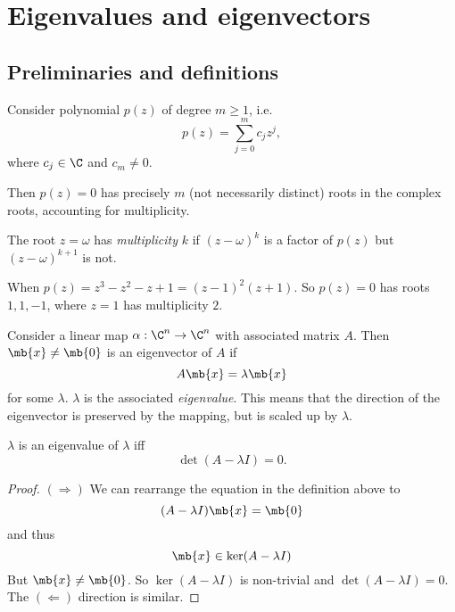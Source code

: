 \documentclass[a4paper]{article}
\begin{document}
\section{Eigenvalues and eigenvectors}
\subsection{Preliminaries and definitions}
\begin{thm}
  Consider polynomial $p(z)$ of degree $m \geq 1$, i.e.
  \[
  p(z) = \sum_{j = 0}^m c_jz^j,
  \]
  where $c_j\in \C$ and $c_m \not= 0$.

  Then $p(z) = 0$ has precisely $m$ (not necessarily distinct) roots in the complex roots, accounting for multiplicity.
\end{thm}

\begin{defi}
  The root $z = \omega$ has \emph{multiplicity} $k$ if $(z - \omega)^k$ is a factor of $p(z)$ but $(z - \omega)^{k + 1}$ is not.
\end{defi}

\begin{eg}
  When $p(z) = z^3 - z^2 - z + 1 = (z - 1)^2(z + 1)$. So $p(z) = 0$ has roots $1, 1, -1$, where $z = 1$ has multiplicity $2$.
\end{eg}

\begin{defi}
  Consider a linear map $\alpha: \C^n\to \C^n$ with associated matrix $A$. Then $\mb{x}\not= \mb{0}$ is an eigenvector of $A$ if
  \[
  A\mb{x} = \lambda\mb{x}
  \]
  for some $\lambda$. $\lambda$ is the associated \emph{eigenvalue}. This means that the direction of the eigenvector is preserved by the mapping, but is scaled up by $\lambda$.
\end{defi}

\begin{thm}
  $\lambda$ is an eigenvalue of $\lambda$ iff
  \[
  \det(A - \lambda I) = 0.
  \]
\end{thm}

\begin{proof}
  $(\Rightarrow)$ We can rearrange the equation in the definition above to
  \[
  (A - \lambda I)\mb{x} = \mb{0}
  \]
  and thus
  \[
  \mb{x}\in \ker(A - \lambda I)
  \]
  But $\mb{x}\not= \mb{0}$. So $\ker(A - \lambda I)$ is non-trivial and $\det(A - \lambda I) = 0$. The $(\Leftarrow)$ direction is similar. 
\end{proof}
\end{document}
